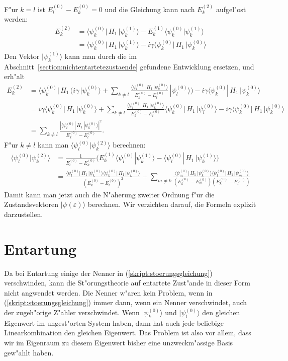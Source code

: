 F"ur $k=l$ ist $E_l^{(0)}-E_k^{(0)}=0$ und die Gleichung kann nach 
$E_k^{(2)}$ aufgel"ost werden:
\begin{align*}
E_k^{(2)}
&=
\langle\psi_k^{(0)}|\, H_1\, |\psi_k^{(1)}\rangle
-E_k^{(1)}\langle\psi_k^{(0)}|\psi_k^{(1)}\rangle
\\
&=
\langle\psi_k^{(0)}|\, H_1\, |\psi_k^{(1)}\rangle
-i\gamma
\langle \psi_k^{(0)}|\, H_1 \,|\psi_k^{(0)}\rangle
\end{align*}
Den Vektor $|\psi_k^{(1)}\rangle$ kann man durch die im
Abschnitt~\ref{section:nichtentartetezustaende} gefundene
Entwicklung ersetzen, und erh"alt
\begin{align*}
E_k^{(2)}
&=
\langle\psi_k^{(0)}|\, H_1\,
\biggl(
i\gamma
\,|\psi_k^{(0)}\rangle
+
\sum_{k\ne l}
\frac{\langle \psi_l^{(0)}|\, H_1 \,|\psi_k^{(0)}\rangle}{E_k^{(0)}-E_l^{(0)}}
\,
|\psi_l^{(0)}\rangle
\biggr)
-i\gamma
\langle \psi_k^{(0)}|\, H_1 \,|\psi_k^{(0)}\rangle
\\
&=
i\gamma\langle\psi_k^{(0)}|\, H_1\, |\psi_k^{(0)}\rangle
+
\sum_{k\ne l}
\frac{\langle \psi_l^{(0)}|\, H_1 \,|\psi_k^{(0)}\rangle}{E_k^{(0)}-E_l^{(0)}}
\langle\psi_k^{(0)}|\, H_1 \,|\psi_l^{(0)}\rangle
-i\gamma
\langle \psi_k^{(0)}|\, H_1 \,|\psi_k^{(0)}\rangle
\\
&=
\sum_{k\ne l}
\frac{|\langle \psi_l^{(0)}|\, H_1 \,|\psi_k^{(0)}\rangle|^2}{E_k^{(0)}-E_l^{(0)}}.
\end{align*}
F"ur $k\ne l$ kann man $\langle\psi_l^{(0)}|\psi_k^{(2)}\rangle$ 
berechnen:
\begin{align*}
\langle\psi_l^{(0)}|\psi_k^{(2)}\rangle
&=
\frac1{E_l^{(0)}-E_k^{(0)}}\biggl(
E_k^{(1)}\langle\psi_l^{(0)}|\psi_k^{(1)}\rangle
-
\langle\psi_l^{(0)}|\,H_1\,|\psi_k^{(1)}\rangle
\biggr)
\\
&=
\frac{
\langle \psi_l^{(0)}|\, H_1 \,|\psi_k^{(0)}\rangle
\langle \psi_k^{(0)}|\, H_1 \,|\psi_k^{(0)}\rangle
}{
(E_k^{(0)}-E_l^{(0)})^2
}
+
\sum_{m\ne k}
\frac{\langle \psi_m^{(0)}|\, H_1 \,|\psi_k^{(0)}\rangle
\langle\psi_l^{(0)}|\, H_1 \,|\psi_m^{(0)}\rangle
}{
(E_k^{(0)}-E_m^{(0)})
(E_k^{(0)}-E_l^{(0)})
}
\end{align*}
Damit kann man jetzt auch die N"aherung zweiter Ordnung
f"ur die Zustandsvektoren $|\psi(\varepsilon)\rangle$
berechnen.
Wir verzichten darauf, die Formeln explizit darzustellen.

\section{Entartung}
Da bei Entartung einige der Nenner in (\ref{skript:stoerungsgleichung})
verschwinden, kann die St"orungstheorie auf entartete Zust"ande
in dieser Form nicht angwendet werden.
Die Nenner w"aren kein Problem, wenn in (\ref{skript:stoerungsgleichung})
immer dann, wenn ein Nenner verschwindet, auch der zugeh"orige Z"ahler
verschwindet.
Wenn $|\psi_k^{(0)}\rangle$ und $|\psi_l^{(0)}\rangle$ den gleichen
Eigenwert im ungest"orten System haben, dann hat auch jede beliebige
Linearkombination den gleichen Eigenwert.
Das Problem ist also vor allem, dass wir im Eigenraum zu diesem
Eigenwert bisher eine unzweckm"assige Basis gew"ahlt haben.

